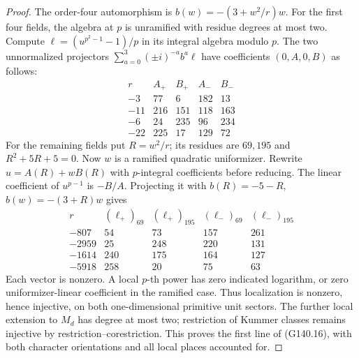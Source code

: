 \begin{proof}
The order-four automorphism is $b(w)=-(3+w^2/r)w$.
For the first four fields, the algebra at $p$ is unramified
with residue degrees at most two.  Compute
$\ell=(u^{p^2-1}-1)/p$ in its integral algebra modulo $p$.
The two unnormalized projectors $\sum_{a=0}^3(\pm i)^{-a}b^a\ell$
have coefficients $(0,A,0,B)$ as follows:
\[
\begin{array}{c|rr|rr}
r&A_+&B_+&A_-&B_-\\\hline
-3&77&6&182&13\\-11&216&151&118&163\\
-6&24&235&96&234\\-22&225&17&129&72
\end{array} \tag{G140.21}
\]
For the remaining fields put $R=w^2/r$; its residues are $69,195$
and $R^2+5R+5=0$.  Now $w$ is a ramified quadratic uniformizer.
Rewrite $u=A(R)+wB(R)$ with $p$-integral coefficients before
reducing.  The linear coefficient of $u^{p-1}$ is $-B/A$.
Projecting it with $b(R)=-5-R$, $b(w)=-(3+R)w$ gives
\[
\begin{array}{c|rr|rr}
r&(\ell_+)_{69}&(\ell_+)_{195}&(\ell_-)_{69}&(\ell_-)_{195}\\\hline
-807&54&73&157&261\\-2959&25&248&220&131\\
-1614&240&175&164&127\\-5918&258&20&75&63
\end{array} \tag{G140.22}
\]
Each vector is nonzero.  A local $p$-th power has zero indicated
logarithm, or zero uniformizer-linear coefficient in the ramified
case.  Thus localization is nonzero, hence injective, on both
one-dimensional primitive unit sectors.  The further local
extension to $M_d$ has degree at most two; restriction of
Kummer classes remains injective by restriction--corestriction.
This proves the first line of (G140.16), with both character
orientations and all local places accounted for.


\end{proof}
